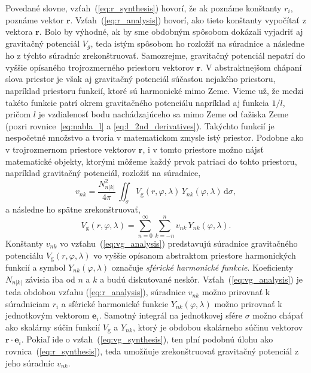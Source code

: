 \documentclass[a4paper, 12pt]{book}
\newcommand{\diff}{\mathrm d}
\newcommand{\gidx}{\mathrm g}
\let\vec\mathbf
\begin{document}
Povedané slovne, vzťah~(\ref{eq:r_synthesis}) hovorí, že ak poznáme konštanty 
$r_i$, poznáme vektor $\vec r$.  Vzťah~(\ref{eq:r_analysis}) hovorí, ako tieto 
konštanty vypočítať z vektora $\vec r$.  Bolo by výhodné, ak by sme obdobným 
spôsobom dokázali vyjadriť aj gravitačný potenciál $V_g$, teda istým spôsobom 
ho rozložiť na súradnice a následne ho z týchto súradníc zrekonštruovať.  
Samozrejme, gravitačný potenciál nepatrí do vyššie opísaného trojrozmerného 
priestoru vektorov $\vec r$.  V abstraktnejšom chápaní slova priestor je však 
aj gravitačný potenciál súčasťou nejakého priestoru, napríklad priestoru 
funkcií, ktoré sú harmonické mimo Zeme.  Vieme už, že medzi takéto funkcie 
patrí okrem gravitačného potenciálu napríklad aj funkcia $1 \slash l$, pričom 
$l$ je vzdialenosť bodu nachádzajúceho sa mimo Zeme od ťažiska Zeme (pozri 
rovnice~\ref{eq:nabla_l} a \ref{eq:l_2nd_derivatives}).  Takýchto funkcií je 
nespočetné množstvo a tvoria v matematickom zmysle istý priestor.  Podobne ako 
v trojrozmernom priestore vektorov $\vec r$, i v tomto priestore možno nájsť 
matematické objekty, ktorými môžeme každý prvok patriaci do tohto priestoru, 
napríklad gravitačný potenciál, rozložiť na súradnice,
%
\begin{equation}
\label{eq:vg_analysis}
v_{nk} = \frac{N^2_{n|k|}}{4\pi} \, \iint_{\sigma} V_\gidx(r, \varphi, \lambda) 
\, Y_{nk}(\varphi, \lambda) \, \diff \sigma{,}
\end{equation}
%
a následne ho spätne zrekonštruovať,
%
\begin{equation}
\label{eq:vg_synthesis}
V_\gidx(r, \varphi, \lambda) = \sum_{n = 0}^{\infty} \sum_{k = -n}^{n} v_{nk} 
\, Y_{nk}(\varphi, \lambda){.}
\end{equation}
%
Konštanty $v_{nk}$ vo vzťahu~(\ref{eq:vg_analysis}) predstavujú súradnice 
gravitačného potenciálu $V_\gidx(r, \varphi, \lambda)$ vo vyššie opísanom 
abstraktom priestore harmonických funkcií a symbol $Y_{nk}(\varphi, \lambda)$ 
označuje \emph{sférické harmonické funkcie}.  Koeficienty $N_{n|k|}$ závisia 
iba od $n$ a $k$ a budú diskutované neskôr.  Vzťah~(\ref{eq:vg_analysis}) je 
teda obdobou vzťahu (\ref{eq:r_analysis}), súradnice $v_{nk}$ možno prirovnať 
k súradniciam $r_i$ a sférické harmonické funkcie $Y_{nk}(\varphi, \lambda)$ 
možno prirovnať k jednotkovým vektorom $\vec e_i$.  Samotný integrál na 
jednotkovej sfére $\sigma$ možno chápať ako skalárny súčin funkcií $V_\gidx$ 
a $Y_{nk}$, ktorý je obdobou skalárneho súčinu vektorov $\vec r \cdot \vec 
e_i$.  Pokiaľ ide o vzťah~(\ref{eq:vg_synthesis}), ten plní podobnú úlohu ako 
rovnica~(\ref{eq:r_synthesis}), teda umožňuje zrekonštruovať gravitačný 
potenciál z jeho súradníc $v_{nk}$.
\end{document}
